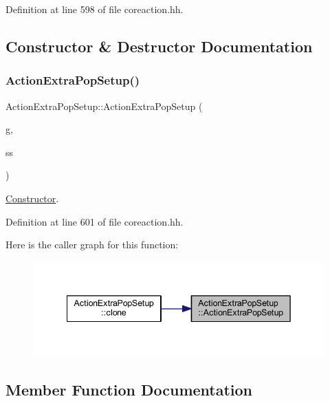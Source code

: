 Definition at line 598 of file coreaction.\+hh.



\subsection{Constructor \& Destructor Documentation}
\mbox{\label{class_action_extra_pop_setup_a4359e4f80655118c2e8e8ac146166319}} 
\subsubsection{\texorpdfstring{ActionExtraPopSetup()}{ActionExtraPopSetup()}}
{\footnotesize\ttfamily Action\+Extra\+Pop\+Setup\+::\+Action\+Extra\+Pop\+Setup (\begin{DoxyParamCaption}\item[{const string \&}]{g,  }\item[{\mbox{\hyperlink{class_addr_space}{Addr\+Space}} $\ast$}]{ss }\end{DoxyParamCaption})\hspace{0.3cm}{\ttfamily [inline]}}



\mbox{\hyperlink{class_constructor}{Constructor}}. 



Definition at line 601 of file coreaction.\+hh.

Here is the caller graph for this function\+:
\nopagebreak
\begin{figure}[H]
\begin{center}
\leavevmode
\includegraphics[width=342pt]{class_action_extra_pop_setup_a4359e4f80655118c2e8e8ac146166319_icgraph}
\end{center}
\end{figure}


\subsection{Member Function Documentation}
\mbox{\label{class_action_extra_pop_setup_a1518c4ca7772ccb59b6cde0857cf657c}} 
